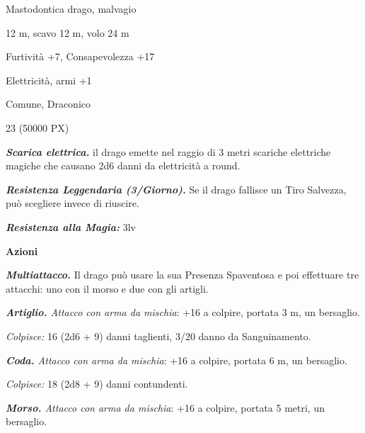 \begin{multicols}{2}
{
\begin{description}[noitemsep, topsep=0pt, parsep=0pt, partopsep=0pt, itemsep=1pt, leftmargin=2.35cm,  labelwidth=2.2cm, itemindent=0cm, listparindent=0pt] %
\setlength{\baselineskip}{10pt}
\item[\textbf{Taglia/Tipo}] Mastodontica drago, malvagio
\item[\textbf{Caratt.}] 
\item[\textbf{Punti Ferita}] 
\item[\textbf{Movimento}] 12 m, scavo 12 m, volo 24 m
\item[\textbf{Tiri Salvez.}] 
\item[\textbf{Comp.}] Furtività +7, Consapevolezza +17
\item[\textbf{Imm. Danni}] Elettricità, armi +1
\item[\textbf{Sensi}] 
\item[\textbf{Linguaggi}] Comune, Draconico
\item[\textbf{Sfida}] 23 (50000 PX)
\end{description}
\smallskip

\emph{\textbf{Scarica elettrica.}} il drago emette nel raggio di 3 metri scariche elettriche magiche che causano 2d6 danni da elettricità a round.

\emph{\textbf{Resistenza Leggendaria (3/Giorno).}} Se il drago fallisce un Tiro Salvezza, può scegliere invece di riuscire.

\emph{\textbf{Resistenza alla Magia:}} 3lv

\textbf{Azioni}

\emph{\textbf{Multiattacco.}} Il drago può usare la sua Presenza Spaventosa e poi effettuare tre attacchi: uno con il morso e due con gli artigli.

\emph{\textbf{Artiglio.} Attacco con arma da mischia}: +16 a colpire,
portata 3 m, un bersaglio.

\emph{Colpisce:} 16 (2d6 + 9) danni taglienti, 3/20 danno da Sanguinamento.

\emph{\textbf{Coda.} Attacco con arma da mischia}: +16 a colpire, portata 6 m, un bersaglio.

\emph{Colpisce:} 18 (2d8 + 9) danni contundenti.

\emph{\textbf{Morso.} Attacco con arma da mischia}: +16 a colpire, portata 5 metri, un bersaglio.

}
\end{multicols}
